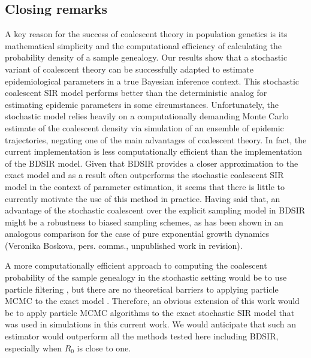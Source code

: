 \documentclass[12pt,titlepage]{article}
\newcommand{\ajd}[1]{{\color{black} #1}}
\newcommand{\BDSIR}{BDSIR}
\begin{document}
\subsection{Closing remarks}

A key reason for the success of coalescent theory in population genetics is its mathematical simplicity and
the computational efficiency of calculating the probability density of a sample genealogy.
Our results show that a stochastic variant of coalescent theory can be successfully adapted to estimate epidemiological parameters in a true Bayesian inference context.
This stochastic coalescent SIR model performs better than the deterministic analog for estimating epidemic parameters in some circumstances.
Unfortunately, the stochastic model relies heavily on a computationally demanding Monte Carlo estimate of the coalescent density via simulation of an ensemble of epidemic trajectories, negating one of the main advantages of coalescent theory.
In fact, the current implementation is less computationally efficient than the implementation of the BDSIR model. Given that BDSIR provides a closer approximation to the exact model and as a result often outperforms the stochastic coalescent SIR model in the context of parameter estimation, it seems that there is little to currently motivate the use of this method in practice. 
\ajd{Having said that, an advantage of the stochastic coalescent over the explicit sampling model in \BDSIR{} might be a robustness to biased sampling schemes, as has been shown in an analogous comparison for the case of pure exponential growth dynamics (Veronika Boskova, pers. comms., unpublished work in revision).}



A more computationally efficient approach to computing the coalescent probability of the sample genealogy in the stochastic setting would be to use particle filtering \citep{Andrieu:2009,andrieu2010particle,Rasmussen2011,Rasmussen2014}, but there are no theoretical barriers to applying particle MCMC to the exact model \citep{Stadler:2014}.
Therefore, an obvious extension of this work would be to apply particle MCMC algorithms to the exact stochastic SIR model that was used in simulations in this current work. We would anticipate that such an estimator would outperform all the methods tested here including \BDSIR{}, especially when $R_0$ is close to one.
\end{document}
